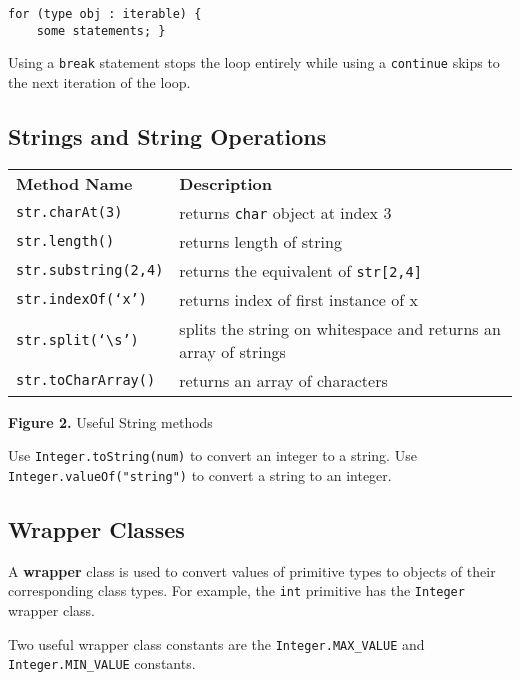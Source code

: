 \documentclass{article}
\newcommand{\nline}{\vspace{\baselineskip}}
\begin{document}
\begin{flushleft}
\begin{verbatim}
for (type obj : iterable) {
    some statements; }
\end{verbatim}

Using a \texttt{break} statement stops the loop entirely while using a \texttt{continue} skips to the next iteration of the loop.

\subsection{Strings and String Operations}

\begin{center}
\begin{tabular}{ l l }
\textbf{Method Name} & \textbf{Description} \\
\texttt{str.charAt(3)} & returns \texttt{char} object at index $3$ \\
\texttt{str.length()} & returns length of string \\
\texttt{str.substring(2,4)} & returns the equivalent of \texttt{str[2,4]} \\
\texttt{str.indexOf(`x')} & returns index of first instance of x \\
\texttt{str.split(`\textbackslash s')} & splits the string on whitespace and returns an array of strings \\
\texttt{str.toCharArray()} & returns an array of characters
\end{tabular}
\vspace{\baselineskip}

\textbf{Figure 2.} Useful String methods
\end{center}

Use \texttt{Integer.toString(num)} to convert an integer to a string. Use \texttt{Integer.valueOf("string")} to convert a string to an integer.

\subsection{Wrapper Classes}

A \textbf{wrapper} class is used to convert values of primitive types to objects of their corresponding class types. For example, the \texttt{int} primitive has the \texttt{Integer} wrapper class.

\nline

Two useful wrapper class constants are the \texttt{Integer.MAX\_VALUE} and \texttt{Integer.MIN\_VALUE} constants.


\end{flushleft}
\end{document}
